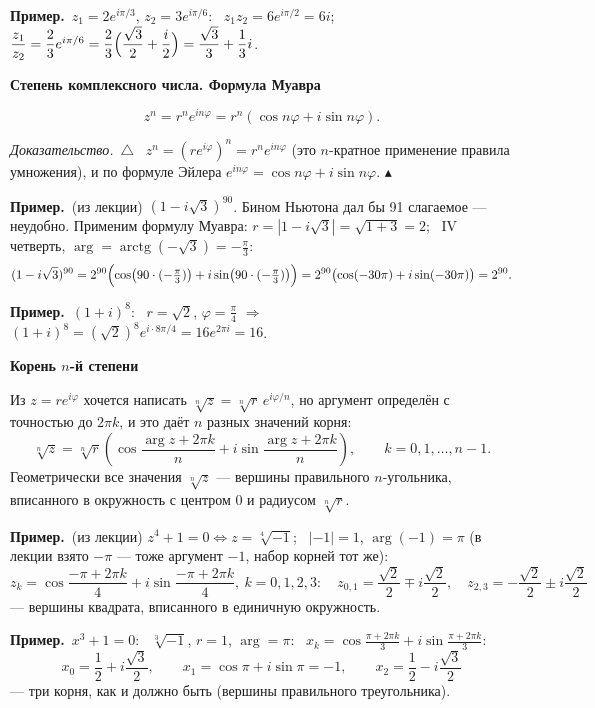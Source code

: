 \documentclass[a4paper,11pt]{article}
\newcommand{\prim}{\par\smallskip\noindent\textbf{\textcolor{teoc!80!black}{Пример.}}\ }
\newenvironment{dok}
  {\par\smallskip\noindent\textit{Доказательство.}\ $\triangle$\ \ignorespaces}
  {\unskip\nobreak\hfill$\blacktriangle$\par\smallskip}
\newcommand{\podr}[1]{\par\needspace{8\baselineskip}\medskip
  {\large\bfseries\textcolor{oprc!80!black}{#1}}\par\nopagebreak\smallskip}
\begin{document}
\prim $z_1 = 2e^{i\pi/3}$, $z_2 = 3e^{i\pi/6}$: \
$z_1 z_2 = 6 e^{i\pi/2} = 6i$; \
$\dfrac{z_1}{z_2} = \dfrac23 e^{i\pi/6} = \dfrac23\Bigl(\dfrac{\sqrt3}{2} + \dfrac i2\Bigr) = \dfrac{\sqrt3}{3} + \dfrac13 i$.

\podr{Степень комплексного числа. Формула Муавра}

\begin{teo}
\[
  z^n = r^n e^{in\varphi} = r^n(\cos n\varphi + i\sin n\varphi).
\]
\end{teo}

\begin{dok}
$z^n = (re^{i\varphi})^n = r^n e^{in\varphi}$ (это $n$-кратное применение правила умножения), и по формуле Эйлера
$e^{in\varphi} = \cos n\varphi + i\sin n\varphi$.
\end{dok}

\prim (из лекции) $(1 - i\sqrt3)^{90}$. Бином Ньютона дал бы 91 слагаемое --- неудобно. Применим формулу Муавра:
$r = |1 - i\sqrt3| = \sqrt{1 + 3} = 2$; \ IV четверть, $\arg = \operatorname{arctg}(-\sqrt3) = -\frac\pi3$:
\[
  (1 - i\sqrt3)^{90} = 2^{90}\Bigl(\cos\bigl(90 \cdot (-\tfrac\pi3)\bigr) + i\sin\bigl(90 \cdot (-\tfrac\pi3)\bigr)\Bigr)
  = 2^{90}\bigl(\cos(-30\pi) + i\sin(-30\pi)\bigr) = 2^{90}.
\]

\prim $(1 + i)^8$: \ $r = \sqrt2$, $\varphi = \frac\pi4$ $\Rightarrow$ $(1 + i)^8 = (\sqrt2)^8 e^{i \cdot 8\pi/4} = 16 e^{2\pi i} = 16$.

\podr{Корень $n$-й степени}

Из $z = re^{i\varphi}$ хочется написать $\sqrt[n]z = \sqrt[n]r\, e^{i\varphi/n}$, но аргумент определён с точностью до $2\pi k$,
и это даёт $n$ разных значений корня:
\[
  \sqrt[n]{z} = \sqrt[n]{r}\left(\cos\frac{\arg z + 2\pi k}{n} + i\sin\frac{\arg z + 2\pi k}{n}\right), \qquad k = 0, 1, \dots, n - 1.
\]
Геометрически все значения $\sqrt[n]{z}$ --- вершины правильного $n$-угольника, вписанного в окружность с центром $0$ и радиусом $\sqrt[n]{r}$.

\prim (из лекции) $z^4 + 1 = 0 \Leftrightarrow z = \sqrt[4]{-1}$; \ $|-1| = 1$, $\arg(-1) = \pi$ (в лекции взято $-\pi$ --- тоже аргумент $-1$,
набор корней тот же):
\[
  z_k = \cos\frac{-\pi + 2\pi k}{4} + i\sin\frac{-\pi + 2\pi k}{4}, \ k = 0, 1, 2, 3:
  \quad z_{0,1} = \frac{\sqrt2}{2} \mp i\frac{\sqrt2}{2}, \quad z_{2,3} = -\frac{\sqrt2}{2} \pm i\frac{\sqrt2}{2}
\]
--- вершины квадрата, вписанного в единичную окружность.

\prim $x^3 + 1 = 0$: \ $\sqrt[3]{-1}$, $r = 1$, $\arg = \pi$: \ $x_k = \cos\frac{\pi + 2\pi k}{3} + i\sin\frac{\pi + 2\pi k}{3}$:
\[
  x_0 = \frac12 + i\frac{\sqrt3}{2}, \qquad x_1 = \cos\pi + i\sin\pi = -1, \qquad x_2 = \frac12 - i\frac{\sqrt3}{2}
\]
--- три корня, как и должно быть (вершины правильного треугольника).
\end{document}
